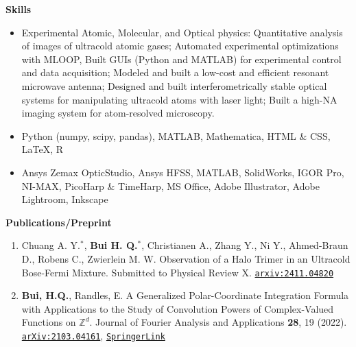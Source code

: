 \documentclass[10pt]{article}
\begin{document}
\noindent \large{\textbf{{Skills}}} \normalsize

\begin{itemize}
\setlength\itemsep{-4pt}
\item Experimental Atomic, Molecular, and Optical physics: Quantitative analysis of images of ultracold atomic gases; Automated experimental optimizations with MLOOP, Built GUIs (Python and MATLAB) for experimental control and data acquisition; Modeled and built a low-cost and efficient resonant microwave antenna; Designed and built interferometrically stable optical systems for manipulating ultracold atoms with laser light; Built a high-NA imaging system for atom-resolved microscopy.
\item {} Python (numpy, scipy, pandas), MATLAB, Mathematica, HTML \& CSS, \LaTeX{}, R
\item {} Ansys Zemax OpticStudio, Ansys HFSS, MATLAB, SolidWorks, IGOR Pro, NI-MAX, PicoHarp \& TimeHarp, MS Office,  Adobe Illustrator, Adobe Lightroom, Inkscape
\end{itemize}


\noindent \large{\textbf{{Publications/Preprint}}}	\normalsize 

\begin{enumerate}
	\setlength\itemsep{-4pt}
 	\item Chuang A. Y.$^*$, \textbf{Bui H. Q.}$^\mathbf{*}$, Christianen A., Zhang Y., Ni Y., Ahmed-Braun D., Robens C., Zwierlein M. W. {Observation of a Halo Trimer in an Ultracold Bose-Fermi Mixture}. Submitted to Physical Review X.  \href{https://arxiv.org/abs/2411.04820}{\texttt{arxiv:2411.04820}}
	\item \textbf{Bui, H.Q.}, Randles, E. {A Generalized Polar-Coordinate Integration Formula with Applications to the Study of Convolution Powers of Complex-Valued Functions on $\mathbb{Z}^d$}. Journal of  Fourier Analysis and Applications \textbf{28}, 19 (2022). \href{https://arxiv.org/abs/2103.04161}{\texttt{arXiv:2103.04161}}, \href{https://doi.org/10.1007/s00041-022-09905-x}{\texttt{SpringerLink}}
	
\end{enumerate}
\end{document}
